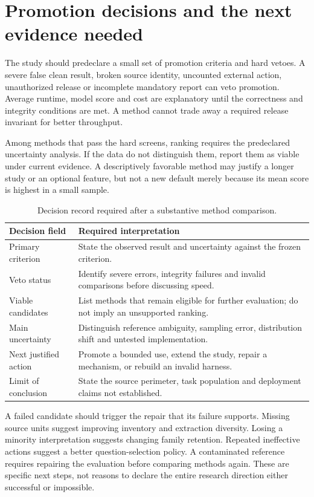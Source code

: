 \documentclass[12pt,a4paper,oneside,openany]{book}
\begin{document}
\section{Promotion decisions and the next evidence needed}

The study should predeclare a small set of promotion criteria and hard vetoes.
A severe false clean result, broken source identity, uncounted external action,
unauthorized release or incomplete mandatory report can veto promotion. Average
runtime, model score and cost are explanatory until the correctness and integrity
conditions are met. A method cannot trade away a required release invariant for
better throughput.

Among methods that pass the hard screens, ranking requires the predeclared
uncertainty analysis. If the data do not distinguish them, report them as viable
under current evidence. A descriptively favorable method may justify a longer
study or an optional feature, but not a new default merely because its mean score
is highest in a small sample.

\begin{table}[htbp]
\centering\small
\caption{Decision record required after a substantive method comparison.}
\begin{tabularx}{\textwidth}{P{39mm}Y}
\toprule
Decision field & Required interpretation\\\midrule
Primary criterion & State the observed result and uncertainty against the frozen criterion.\\
Veto status & Identify severe errors, integrity failures and invalid comparisons before discussing speed.\\
Viable candidates & List methods that remain eligible for further evaluation; do not imply an unsupported ranking.\\
Main uncertainty & Distinguish reference ambiguity, sampling error, distribution shift and untested implementation.\\
Next justified action & Promote a bounded use, extend the study, repair a mechanism, or rebuild an invalid harness.\\
Limit of conclusion & State the source perimeter, task population and deployment claims not established.\\
\bottomrule
\end{tabularx}
\end{table}

A failed candidate should trigger the repair that its failure supports. Missing
source units suggest improving inventory and extraction diversity. Losing a
minority interpretation suggests changing family retention. Repeated ineffective
actions suggest a better question-selection policy. A contaminated reference
requires repairing the evaluation before comparing methods again. These are
specific next steps, not reasons to declare the entire research direction either
successful or impossible.
\end{document}
